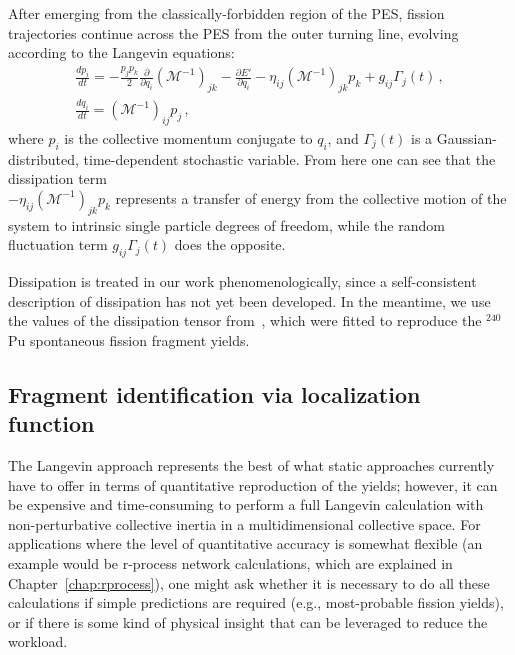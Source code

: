 After emerging from the classically-forbidden region of the PES, fission trajectories continue across the PES from the outer turning line, evolving according to the Langevin equations:
\begin{gather}\label{eq:langevin} 
	\frac{dp_i}{dt} =  
	-\frac{p_j p_k}{2} \frac{\partial}{\partial q_i}\left(\mathcal{M}^{-1}\right)_{jk} 
	- \frac{\partial E'}{\partial q_i}  - \eta_{ij}\left(\mathcal{M}^{-1}\right)_{jk} p_k + g_{ij}\Gamma_j(t) \,, \\ 
	\frac{dq_i}{dt} = 	\left(\mathcal{M}^{-1}\right)_{ij} p_j \,,  
\end{gather} 
\noindent where $p_i$ is the collective momentum conjugate to $q_i$, and $\Gamma_j(t)$ is a Gaussian-distributed, time-dependent stochastic variable. From here one can see that the dissipation term\\\noindent $- \eta_{ij}\left(\mathcal{M}^{-1}\right)_{jk} p_k$ represents a transfer of energy from the collective motion of the system to intrinsic single particle degrees of freedom, while the random fluctuation term $g_{ij}\Gamma_j(t)$ does the opposite.

Dissipation is treated in our work phenomenologically, since a self-consistent description of dissipation has not yet been developed.  In the meantime, we use the values of the dissipation tensor from~\cite{Sadhukhan2016}, which were fitted to reproduce the $^{240}$Pu spontaneous fission fragment yields.%

\subsection{Fragment identification via localization function}\label{sect:FragID}
The Langevin approach represents the best of what static approaches currently have to offer in terms of quantitative reproduction of the yields; however, it can be expensive and time-consuming to perform a full Langevin calculation with non-perturbative collective inertia in a multidimensional collective space. For applications where the level of quantitative accuracy is somewhat flexible (an example would be r-process network calculations, which are explained in Chapter~\ref{chap:rprocess}), one might ask whether it is necessary to do all these calculations if simple predictions are required (e.g., most-probable fission yields), or if there is some kind of physical insight that can be leveraged to reduce the workload.

